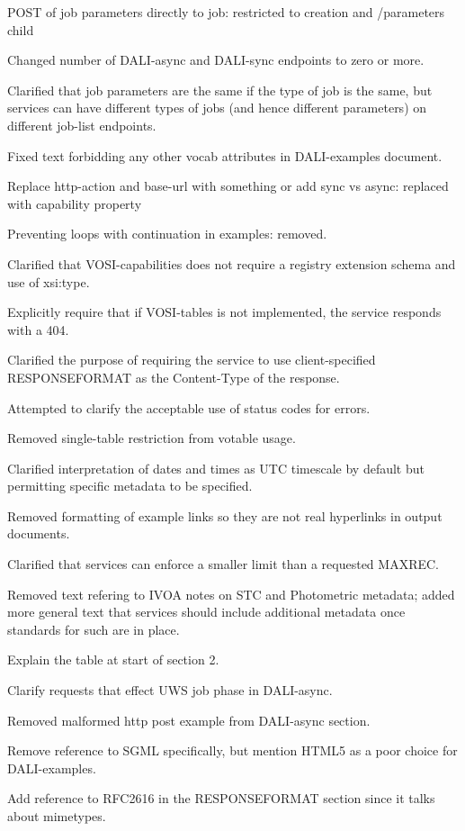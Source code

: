 \documentclass[11pt,letter]{ivoa}
\begin{document}
POST of job parameters directly to job: restricted to creation and /parameters
child

Changed number of DALI-async and DALI-sync endpoints to zero or more.

Clarified that job parameters are the same if the type of job is the same, but
services can have different types of jobs (and hence different parameters) on
different job-list endpoints.

Fixed text forbidding any other vocab attributes in DALI-examples document.

Replace http-action and base-url with something or add sync vs async: replaced
with capability property

Preventing loops with continuation in examples: removed.

Clarified that VOSI-capabilities does not require a registry extension schema
and use of xsi:type.

Explicitly require that if VOSI-tables is not implemented, the service responds
with a 404.

Clarified the purpose of requiring the service to use client-specified
RESPONSEFORMAT as the Content-Type of the response.

Attempted to clarify the acceptable use of status codes for errors.

Removed single-table restriction from votable usage.

Clarified interpretation of dates and times as UTC timescale by default but
permitting specific metadata to be specified.

Removed formatting of example links so they are not real hyperlinks in output
documents.

Clarified that services can enforce a smaller limit than a requested MAXREC.

Removed text refering to IVOA notes on STC and Photometric metadata; added more
general text that services should include additional metadata once standards for
such are in place.

Explain the table at start of section 2.

Clarify requests that effect UWS job phase in DALI-async.

Removed malformed http post example from DALI-async section.

Remove reference to SGML specifically, but mention HTML5 as a poor choice for
DALI-examples.

Add reference to RFC2616 in the RESPONSEFORMAT section since it talks about
mimetypes.
\end{document}
